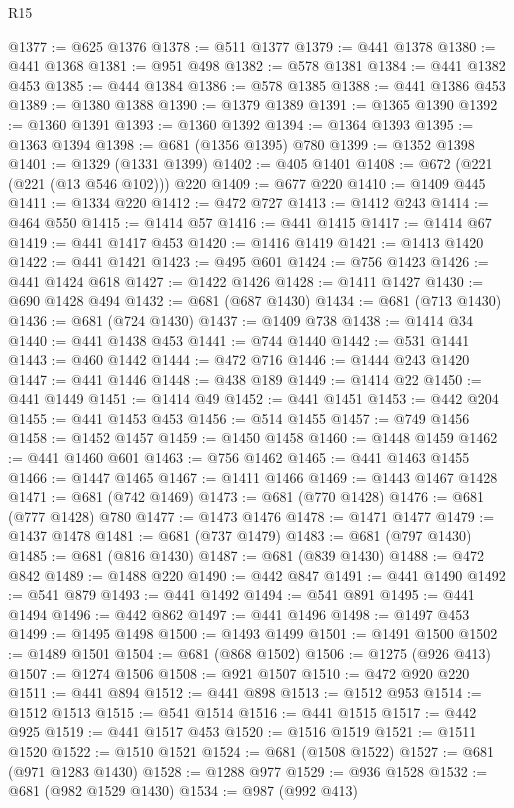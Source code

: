 \begin{lexlean}{R15}
\begin{coremodule}
@1377 := @625 @1376
@1378 := @511 @1377
@1379 := @441 @1378
@1380 := @441 @1368
@1381 := @951 @498
@1382 := @578 @1381
@1384 := @441 @1382 @453
@1385 := @444 @1384
@1386 := @578 @1385
@1388 := @441 @1386 @453
@1389 := @1380 @1388
@1390 := @1379 @1389
@1391 := @1365 @1390
@1392 := @1360 @1391
@1393 := @1360 @1392
@1394 := @1364 @1393
@1395 := @1363 @1394
@1398 := @681 (@1356 @1395) @780
@1399 := @1352 @1398
@1401 := @1329 (@1331 @1399)
@1402 := @405 @1401
@1408 := @672 (@221 (@221 (@13 @546 @102))) @220
@1409 := @677 @220
@1410 := @1409 @445
@1411 := @1334 @220
@1412 := @472 @727
@1413 := @1412 @243
@1414 := @464 @550
@1415 := @1414 @57
@1416 := @441 @1415
@1417 := @1414 @67
@1419 := @441 @1417 @453
@1420 := @1416 @1419
@1421 := @1413 @1420
@1422 := @441 @1421
@1423 := @495 @601
@1424 := @756 @1423
@1426 := @441 @1424 @618
@1427 := @1422 @1426
@1428 := @1411 @1427
@1430 := @690 @1428 @494
@1432 := @681 (@687 @1430)
@1434 := @681 (@713 @1430)
@1436 := @681 (@724 @1430)
@1437 := @1409 @738
@1438 := @1414 @34
@1440 := @441 @1438 @453
@1441 := @744 @1440
@1442 := @531 @1441
@1443 := @460 @1442
@1444 := @472 @716
@1446 := @1444 @243 @1420
@1447 := @441 @1446
@1448 := @438 @189
@1449 := @1414 @22
@1450 := @441 @1449
@1451 := @1414 @49
@1452 := @441 @1451
@1453 := @442 @204
@1455 := @441 @1453 @453
@1456 := @514 @1455
@1457 := @749 @1456
@1458 := @1452 @1457
@1459 := @1450 @1458
@1460 := @1448 @1459
@1462 := @441 @1460 @601
@1463 := @756 @1462
@1465 := @441 @1463 @1455
@1466 := @1447 @1465
@1467 := @1411 @1466
@1469 := @1443 @1467 @1428
@1471 := @681 (@742 @1469)
@1473 := @681 (@770 @1428)
@1476 := @681 (@777 @1428) @780
@1477 := @1473 @1476
@1478 := @1471 @1477
@1479 := @1437 @1478
@1481 := @681 (@737 @1479)
@1483 := @681 (@797 @1430)
@1485 := @681 (@816 @1430)
@1487 := @681 (@839 @1430)
@1488 := @472 @842
@1489 := @1488 @220
@1490 := @442 @847
@1491 := @441 @1490
@1492 := @541 @879
@1493 := @441 @1492
@1494 := @541 @891
@1495 := @441 @1494
@1496 := @442 @862
@1497 := @441 @1496
@1498 := @1497 @453
@1499 := @1495 @1498
@1500 := @1493 @1499
@1501 := @1491 @1500
@1502 := @1489 @1501
@1504 := @681 (@868 @1502)
@1506 := @1275 (@926 @413)
@1507 := @1274 @1506
@1508 := @921 @1507
@1510 := @472 @920 @220
@1511 := @441 @894
@1512 := @441 @898
@1513 := @1512 @953
@1514 := @1512 @1513
@1515 := @541 @1514
@1516 := @441 @1515
@1517 := @442 @925
@1519 := @441 @1517 @453
@1520 := @1516 @1519
@1521 := @1511 @1520
@1522 := @1510 @1521
@1524 := @681 (@1508 @1522)
@1527 := @681 (@971 @1283 @1430)
@1528 := @1288 @977
@1529 := @936 @1528
@1532 := @681 (@982 @1529 @1430)
@1534 := @987 (@992 @413)

\end{coremodule}
\end{lexlean}
